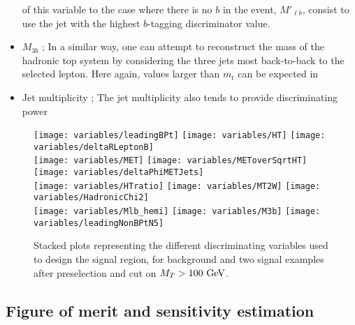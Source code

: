 \begin{itemize}
            of this variable to the case where there is no $b$ in the event, $M'_{\ell b}$, consist
            to use the jet with the highest $b$-tagging discriminator value.
        \item $M_{3b}$ ; In a similar way, one can attempt to reconstruct the mass of the hadronic top system by considering the
            three jets most back-to-back to the selected lepton. Here again, values larger than $m_t$ can be expected in
        \item Jet multiplicity ; The jet multiplicity also tends to provide discriminating power 
    \end{itemize}

    \begin{figure}[h!]
        \centering
        \texttt{[image: variables/leadingBPt]}
        \texttt{[image: variables/HT]}
        \texttt{[image: variables/deltaRLeptonB]}\\
        \texttt{[image: variables/MET]}
        \texttt{[image: variables/METoverSqrtHT]}
        \texttt{[image: variables/deltaPhiMETJets]}\\
        \texttt{[image: variables/HTratio]}
        \texttt{[image: variables/MT2W]}
        \texttt{[image: variables/HadronicChi2]}\\
        \texttt{[image: variables/Mlb\_hemi]}
        \texttt{[image: variables/M3b]}
        \texttt{[image: variables/leadingNonBPtN5]}
        \caption{Stacked plots representing the different discriminating variables used to design the signal region, for background and two signal examples after preselection and cut on $M_T > 100 ~\text{GeV}$.
        }
        \label{fig:variables}
    \end{figure}

    \subsection{Figure of merit and sensitivity estimation}

